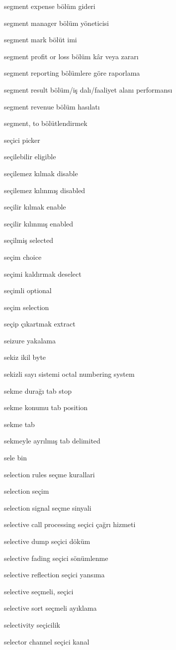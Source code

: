 \documentclass[12pt,fleqn]{article}\usepackage{../../common}
\begin{document}
segment expense bölüm gideri

segment manager bölüm yöneticisi

segment mark bölüt imi

segment profit or loss bölüm kâr veya zararı

segment reporting bölümlere göre raporlama

segment result bölüm/iş dalı/faaliyet alanı performansı

segment revenue bölüm hasılatı

segment, to bölütlendirmek

seçici picker

seçilebilir eligible

seçilemez kılmak disable

seçilemez kılınmış disabled

seçilir kılmak enable

seçilir kılınmış enabled

seçilmiş selected

seçim choice

seçimi kaldırmak deselect

seçimli optional

seçim selection

seçip çıkartmak extract

seizure yakalama

sekiz ikil byte

sekizli sayı sistemi octal numbering system

sekme durağı tab stop

sekme konumu tab position

sekme tab

sekmeyle ayrılmış tab delimited

sele bin

selection rules seçme kurallari

selection seçim

selection signal seçme sinyali

selective call processing seçici çağrı hizmeti

selective dump seçici döküm

selective fading seçici sönümlenme

selective reflection seçici yansıma

selective seçmeli, seçici

selective sort seçmeli ayıklama

selectivity seçicilik

selector channel seçici kanal
\end{document}
